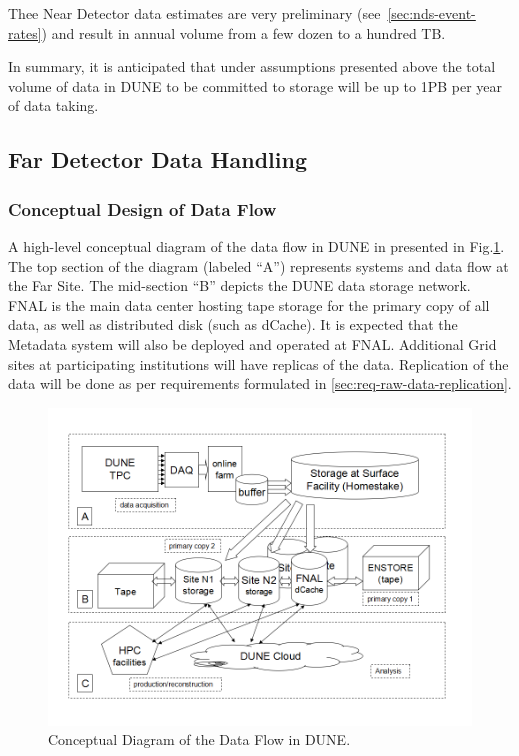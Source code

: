 Thee Near Detector data estimates are very preliminary (see~\ref{sec:nds-event-rates}) and result in annual
volume from a few dozen to a hundred TB.

In summary, it is anticipated that under assumptions presented above the total volume of data in DUNE to be
committed to storage will be up to 1PB per year of data taking.

\subsection{Far Detector Data Handling}
\subsubsection{Conceptual Design of Data Flow}
A high-level conceptual diagram of the data flow in DUNE in presented in Fig.\ref{fig:DUNEdataflow}.
The top section of the diagram (labeled ``A'') represents systems and data flow at the Far Site.
The mid-section ``B'' depicts the DUNE data storage network. FNAL is the main data center
hosting tape storage for the primary copy of all data, as well as distributed disk (such as dCache).
It is expected that the Metadata system will also be deployed and operated at FNAL.
Additional Grid sites at participating institutions will have replicas of the data.
Replication of the data will be done as per requirements formulated in \ref{sec:req-raw-data-replication}.

\begin{figure}[h!]
\centering
\includegraphics[width=\textwidth]{DUNEdataflow.png}
\caption{Conceptual Diagram of the Data Flow in DUNE.}
\label{fig:DUNEdataflow}
\end{figure}

